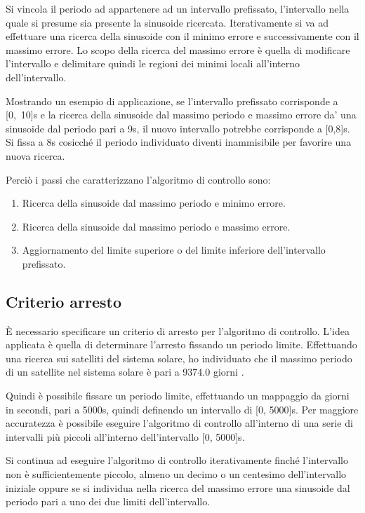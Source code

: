 \documentclass[a4paper,12pt]{report}
\begin{document}
Si vincola il periodo ad appartenere ad un intervallo prefissato, l'intervallo nella quale si presume sia presente la sinusoide ricercata. Iterativamente si va ad effettuare una ricerca della sinusoide con il minimo errore e successivamente con il massimo errore. Lo scopo della ricerca del massimo errore è quella di modificare l'intervallo e delimitare quindi le regioni dei minimi locali all'interno dell'intervallo.

Mostrando un esempio di applicazione, se l'intervallo prefissato corrisponde a [0,~10]s e la ricerca della sinusoide dal massimo periodo e massimo errore da' una sinusoide dal periodo pari a 9s, il nuovo intervallo potrebbe corrisponde a [0,8]s. Si fissa a 8s cosicché il periodo individuato diventi inammisibile per favorire una nuova ricerca.

Perciò i passi che caratterizzano l'algoritmo di controllo sono:
\begin{enumerate}
  \item Ricerca della sinusoide dal massimo periodo e minimo errore.
  \item Ricerca della sinusoide dal massimo periodo e massimo errore.
  \item Aggiornamento del limite superiore o del limite inferiore dell'intervallo prefissato.
\end{enumerate}


\subsection{Criterio arresto}
\label{ss:arresto}
È necessario specificare un criterio di arresto per l'algoritmo di controllo. L'idea applicata è quella di determinare l'arresto fissando un periodo limite. Effettuando una ricerca sui satelliti del sistema solare, ho individuato che il massimo periodo di un satellite nel sistema solare è pari a 9374.0 giorni \cite{nasa}.

Quindi è possibile fissare un periodo limite, effettuando un mappaggio da giorni in secondi, pari a 5000s, quindi definendo un intervallo di [0, 5000]s.
Per maggiore accuratezza è possibile eseguire l'algoritmo di controllo all'interno di una serie di intervalli più piccoli all'interno dell'intervallo [0, 5000]s.

Si continua ad eseguire l'algoritmo di controllo iterativamente finché l'intervallo non è sufficientemente piccolo, almeno un decimo o un centesimo dell'intervallo iniziale oppure se si individua nella ricerca del massimo errore una sinusoide dal periodo pari a uno dei due limiti dell'intervallo.
\end{document}
